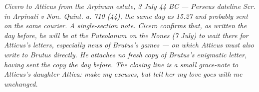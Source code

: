 
\textit{Cicero to Atticus from the Arpinum estate, 3 July 44 BC
--- Perseus dateline \textit{Scr. in Arpinati v Non. Quint. a.
710 (44)}, the same day as 15.27 and probably sent on the same
courier. A single-section note. Cicero confirms that, as written
the day before, he will be at the Puteolanum on the Nones (7 July)
to wait there for Atticus's letters, especially news of Brutus's
games --- on which Atticus must also write to Brutus directly. He
attaches no fresh copy of Brutus's enigmatic letter, having sent
the copy the day before. The closing line is a small grace-note to
Atticus's daughter Attica: make my excuses, but tell her my love
goes with me unchanged.}
